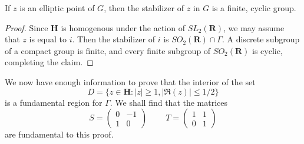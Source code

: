 \begin{theorem}
    If $z$ is an elliptic point of $G$, then the stabilizer of $z$ in $G$ is a finite, cyclic group.
\end{theorem}
\begin{proof}
    Since $\mathbf{H}$ is homogenous under the action of $SL_2(\mathbf{R})$, we may assume that $z$ is equal to $i$. Then the stabilizer of $i$ is $SO_2(\mathbf{R}) \cap \Gamma$. A discrete subgroup of a compact group is finite, and every finite subgroup of $SO_2(\mathbf{R})$ is cyclic, completing the claim.
\end{proof}

We now have enough information to prove that the interior of the set
%
\[ D = \{ z \in \mathbf{H} : |z| \geq 1, |\Re(z)| \leq 1/2 \} \]
%
is a fundamental region for $\Gamma$. We shall find that the matrices
%
\[ S = \begin{pmatrix} 0 & -1 \\ 1 & 0 \end{pmatrix}\ \ \ \ \ \ \ \ \ \ T = \begin{pmatrix} 1 & 1 \\ 0 & 1 \end{pmatrix} \]
%
are fundamental to this proof.

